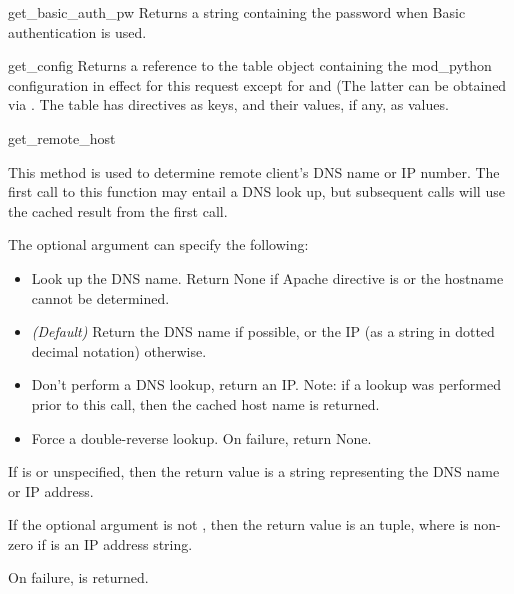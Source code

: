 \begin{methoddesc}[Request]{get_basic_auth_pw}{}
Returns a string containing the password when Basic authentication is
used.
\end{methoddesc}

\begin{methoddesc}[Request]{get_config}{}
Returns a reference to the table object containing the mod_python
configuration in effect for this request except for
 and  (The latter can be
obtained via . The table has directives as
keys, and their values, if any, as values.
\end{methoddesc}

\begin{methoddesc}[Request]{get_remote_host}{}

This method is used to determine remote client's DNS name or IP
number. The first call to this function may entail a DNS look up, but
subsequent calls will use the cached result from the first call.

The optional  argument can specify the following: 

\begin{itemize}

\item
{} Look up the DNS name. Return None if Apache
directive  is  or the hostname cannot
be determined.

\item                  
{} \emph{(Default)} Return the DNS name if
possible, or the IP (as a string in dotted decimal notation)
otherwise.

\item
{} Don't perform a DNS lookup, return an
IP. Note: if a lookup was performed prior to this call, then the
cached host name is returned.

\item
{} Force a double-reverse lookup. On 
failure, return None.

\end{itemize}

If  is  or unspecified, then the return
value is a string representing the DNS name or IP address.

If the optional  argument is not , then the
return value is an  tuple, where 
is non-zero if  is an IP address string.

On failure,  is returned.

\end{methoddesc}

